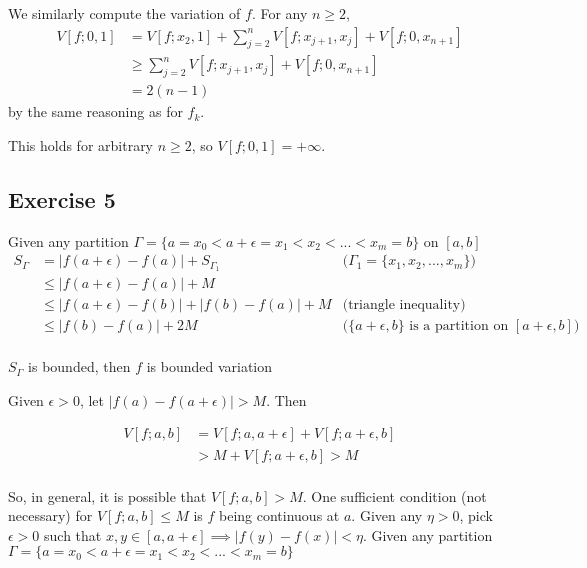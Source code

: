\documentclass{article}
\begin{document}
We similarly compute the variation of $f$. For any $n \geq 2$, 
\begin{align*}
	V[f; 0, 1] &= V[f; x_{2}, 1] + \sum_{j = 2}^{n} V[f; x_{j+1}, x_{j}] + V[f; 0, x_{n+1}] \\
	&\geq \sum_{j = 2}^{n} V[f; x_{j+1}, x_{j}] + V[f; 0, x_{n+1}] \\
	&= 2(n-1)
\end{align*}
by the same reasoning as for $f_{k}$.

This holds for arbitrary $n \geq 2$, so $V[f; 0, 1] = +\infty$.

\subsection{Exercise 5}
\iffalse

Given any partition $\Gamma = \{a = x_0 < a + \epsilon = x_1 < x_2 < ...< x_m = b \}$ on $[a, b]$
\begin{align*}
    S_\Gamma
    &= |f(a+\epsilon) - f(a)| + S_{\Gamma_1} &\text{($\Gamma_1 = \{x_1, x_2, ..., x_m \}$)}\\
    &\leq |f(a+\epsilon) - f(a)| + M\\
    &\leq |f(a+\epsilon) - f(b)| + |f(b) - f(a)| + M &\text{(triangle inequality)}\\
    &\leq |f(b) - f(a)| + 2M &\text{($\{ a + \epsilon, b \}$ is a partition on $[a + \epsilon, b]$)}\\
\end{align*}

$S_\Gamma$ is bounded, then $f$ is bounded variation

Given $\epsilon > 0$, let $|f(a) - f(a + \epsilon)| > M$. Then

\begin{align*}
    V[f; a, b]
        &= V[f; a, a+\epsilon] + V[f; a + \epsilon, b] \\
        &> M + V[f; a + \epsilon, b] > M \\
\end{align*}

So, in general, it is possible that $V[f; a, b] > M$.
One sufficient condition (not necessary) for $V[f; a, b] \leq M$ is $f$ being continuous at $a$. Given any $\eta > 0$, pick $\epsilon > 0$ such that $x, y \in [a, a+\epsilon] \implies |f(y) - f(x)| < \eta$. Given any partition $\Gamma = \{a = x_0 < a + \epsilon = x_1 < x_2 < ...< x_m = b \}$
\end{document}
